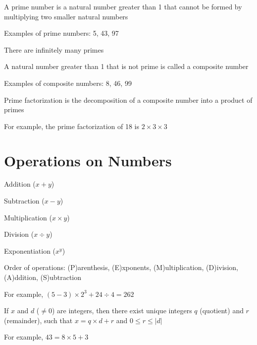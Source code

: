 \documentclass[8pt,a4paper,compress]{beamer}
\begin{document}
\begin{frame}[fragile]
\pause\transdissolve

A prime number is a natural number greater than 1 that cannot be formed by multiplying two smaller natural numbers

\pause\transdissolve\bigskip

Examples of prime numbers: 5, 43, 97

\pause\transdissolve\bigskip

There are infinitely many primes

\pause\transdissolve\bigskip

A natural number greater than 1 that is not prime is called a composite number

\pause\transdissolve\bigskip

Examples of composite numbers: 8, 46, 99

\pause\transdissolve\bigskip

Prime factorization is the decomposition of a composite number into a product of primes

\pause\transdissolve\bigskip

For example, the prime factorization of 18 is $2 \times 3 \times 3$
\end{frame}

\section{Operations on Numbers}
\begin{frame}[fragile]
\pause\transdissolve

Addition ($x + y$)

\pause\transdissolve\bigskip

Subtraction ($x - y$)

\pause\transdissolve\bigskip

Multiplication ($x \times y$)

\pause\transdissolve\bigskip

Division ($x \div y$)

\pause\transdissolve\bigskip

Exponentiation ($x^y$)

\pause\transdissolve\bigskip

Order of operations: (P)arenthesis, (E)xponents, (M)ultiplication, (D)ivision, (A)ddition, (S)ubtraction

\pause\transdissolve\bigskip

For example, $(5 - 3) \times 2^3 + 24 \div 4 = 262$

\pause\transdissolve\bigskip

If $x$ and $d$ ($\neq 0$) are integers, then there exist unique integers $q$ (quotient) and $r$ (remainder), such that $x = q \times d + r$ and $0 \leq r \leq |d|$

\pause\transdissolve\bigskip

For example, $43 = 8 \times 5 + 3$
\end{frame}
\end{document}
